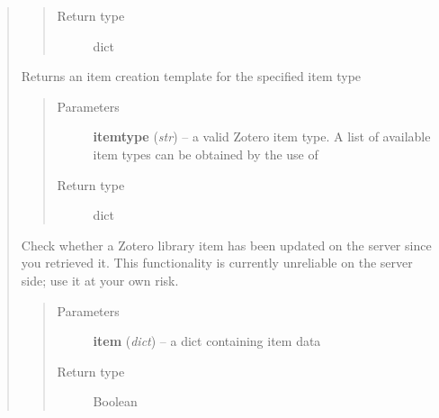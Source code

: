 \documentclass[letterpaper,10pt,english]{sphinxmanual}
\begin{document}
\begin{quote}
\begin{fulllineitems}
\begin{quote}
\begin{description}
\item[{Return type}] \leavevmode
dict

\end{description}\end{quote}

\end{fulllineitems}



\begin{fulllineitems}
\label{index:pyzotero.zotero.Zotero.item_template}
Returns an item creation template for the specified item type
\begin{quote}\begin{description}
\item[{Parameters}] \leavevmode
\textbf{itemtype} (\emph{str}) -- a valid Zotero item type. A list of available item types can be obtained by the use of {\hyperref[index:pyzotero.zotero.Zotero.item_types]{}}

\item[{Return type}] \leavevmode
dict

\end{description}\end{quote}

\end{fulllineitems}



\begin{fulllineitems}
\label{index:pyzotero.zotero.Zotero.check_updated}
Check whether a Zotero library item has been updated on the server since you retrieved it. This functionality is currently unreliable on the server side; use it at your own risk.
\begin{quote}\begin{description}
\item[{Parameters}] \leavevmode
\textbf{item} (\emph{dict}) -- a dict containing item data

\item[{Return type}] \leavevmode
Boolean

\end{description}\end{quote}

\end{fulllineitems}



\end{quote}
\end{document}

